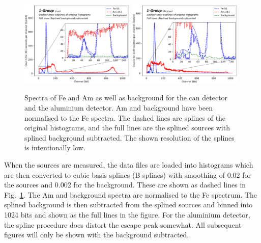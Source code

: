\begin{figure}[htb]
  \includegraphics[width=0.49\textwidth,page=1]{graphics/bkgsubtraction.pdf}
  \includegraphics[width=0.49\textwidth,page=1]{graphics/alubkgsubtraction.pdf}
  \caption{Spectra of Fe and Am as well as background for the can detector and the aluminium detector. Am and background have been normalised to the Fe spectra. The dashed lines are splines of the original histograms, and the full lines are the splined sources with splined background subtracted. The shown resolution of the splines is intentionally low.}
  \label{fig:spectra}
\end{figure}

When the sources are measured, the data files are loaded into histograms which are then converted to cubic basis splines (B-splines) with smoothing of 0.02 for the sources and 0.002 for the background. These are shown as dashed lines in Fig.~\ref{fig:spectra}. The Am and background spectra are normalised to the Fe spectrum. The splined background is then subtracted from the splined sources and binned into 1024 bits and shown as the full lines in the figure. For the aluminium detector, the spline procedure does distort the escape peak somewhat. All subsequent figures will only be shown with the background subtracted.

